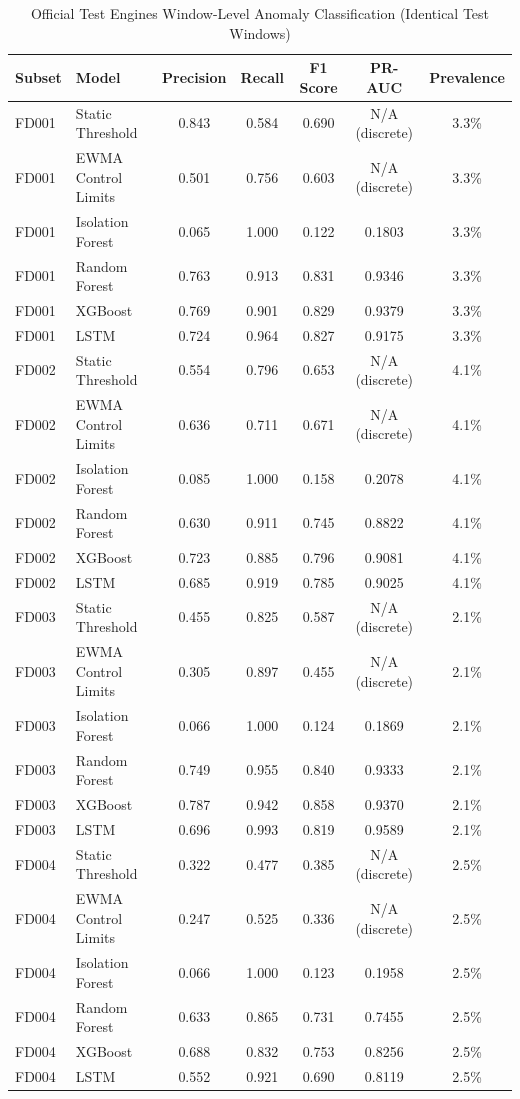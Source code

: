 \begin{table}[t!]
\centering
\small
\caption{Official Test Engines Window-Level Anomaly Classification (Identical Test Windows)}
\label{tab:test_anomaly_metrics}
\begin{tabular}{llccccc}
\toprule
\textbf{Subset} & \textbf{Model} & \textbf{Precision} & \textbf{Recall} & \textbf{F1 Score} & \textbf{PR-AUC} & \textbf{Prevalence} \\
\midrule
FD001 & Static Threshold & 0.843 & 0.584 & 0.690 & N/A (discrete) & 3.3\% \\
FD001 & EWMA Control Limits & 0.501 & 0.756 & 0.603 & N/A (discrete) & 3.3\% \\
FD001 & Isolation Forest & 0.065 & 1.000 & 0.122 & 0.1803 & 3.3\% \\
FD001 & Random Forest & 0.763 & 0.913 & 0.831 & 0.9346 & 3.3\% \\
FD001 & XGBoost & 0.769 & 0.901 & 0.829 & 0.9379 & 3.3\% \\
FD001 & LSTM & 0.724 & 0.964 & 0.827 & 0.9175 & 3.3\% \\
\midrule
FD002 & Static Threshold & 0.554 & 0.796 & 0.653 & N/A (discrete) & 4.1\% \\
FD002 & EWMA Control Limits & 0.636 & 0.711 & 0.671 & N/A (discrete) & 4.1\% \\
FD002 & Isolation Forest & 0.085 & 1.000 & 0.158 & 0.2078 & 4.1\% \\
FD002 & Random Forest & 0.630 & 0.911 & 0.745 & 0.8822 & 4.1\% \\
FD002 & XGBoost & 0.723 & 0.885 & 0.796 & 0.9081 & 4.1\% \\
FD002 & LSTM & 0.685 & 0.919 & 0.785 & 0.9025 & 4.1\% \\
\midrule
FD003 & Static Threshold & 0.455 & 0.825 & 0.587 & N/A (discrete) & 2.1\% \\
FD003 & EWMA Control Limits & 0.305 & 0.897 & 0.455 & N/A (discrete) & 2.1\% \\
FD003 & Isolation Forest & 0.066 & 1.000 & 0.124 & 0.1869 & 2.1\% \\
FD003 & Random Forest & 0.749 & 0.955 & 0.840 & 0.9333 & 2.1\% \\
FD003 & XGBoost & 0.787 & 0.942 & 0.858 & 0.9370 & 2.1\% \\
FD003 & LSTM & 0.696 & 0.993 & 0.819 & 0.9589 & 2.1\% \\
\midrule
FD004 & Static Threshold & 0.322 & 0.477 & 0.385 & N/A (discrete) & 2.5\% \\
FD004 & EWMA Control Limits & 0.247 & 0.525 & 0.336 & N/A (discrete) & 2.5\% \\
FD004 & Isolation Forest & 0.066 & 1.000 & 0.123 & 0.1958 & 2.5\% \\
FD004 & Random Forest & 0.633 & 0.865 & 0.731 & 0.7455 & 2.5\% \\
FD004 & XGBoost & 0.688 & 0.832 & 0.753 & 0.8256 & 2.5\% \\
FD004 & LSTM & 0.552 & 0.921 & 0.690 & 0.8119 & 2.5\% \\
\bottomrule
\end{tabular}
\end{table}

